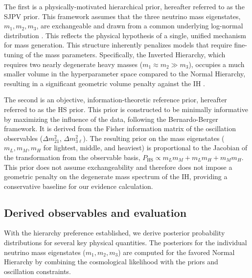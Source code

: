 \documentclass[]{article}
\begin{document}
The first is a physically-motivated hierarchical prior, hereafter referred to as the SJPV prior. This framework assumes that the three neutrino mass eigenstates, $m_1, m_2, m_3$, are exchangeable and drawn from a common underlying log-normal distribution \citep{schwetz2017commentstrongevidencenormal}. This reflects the physical hypothesis of a single, unified mechanism for mass generation. This structure inherently penalizes models that require fine-tuning of the mass parameters. Specifically, the Inverted Hierarchy, which requires two nearly degenerate heavy masses ($m_1 \approx m_2 \gg m_3$), occupies a much smaller volume in the hyperparameter space compared to the Normal Hierarchy, resulting in a significant geometric volume penalty against the IH \citep{schwetz2017commentstrongevidencenormal}.

The second is an objective, information-theoretic reference prior, hereafter referred to as the HS prior. This prior is constructed to be minimally informative by maximizing the influence of the data, following the Bernardo-Berger framework. It is derived from the Fisher information matrix of the oscillation observables ($\Delta m^2_{21}$, $\Delta m^2_{3\ell}$). The resulting prior on the mass eigenstates ($m_L, m_M, m_H$ for lightest, middle, and heaviest) is proportional to the Jacobian of the transformation from the observable basis, $P_{\text{HS}} \propto m_L m_M + m_L m_H + m_M m_H$. This prior does not assume exchangeability and therefore does not impose a geometric penalty on the degenerate mass spectrum of the IH, providing a conservative baseline for our evidence calculation.

\subsection{Derived observables and evaluation}
With the hierarchy preference established, we derive posterior probability distributions for several key physical quantities. The posteriors for the individual neutrino mass eigenstates ($m_1, m_2, m_3$) are computed for the favored Normal Hierarchy by combining the cosmological likelihood with the priors and oscillation constraints.
\end{document}
